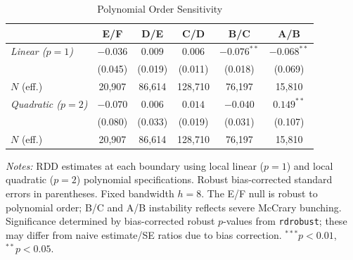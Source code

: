 \begin{table}[H]
\centering
\caption{Polynomial Order Sensitivity}
\label{tab:poly_sensitivity}
\begin{tabular}{lccccc}
\toprule
 & E/F & D/E & C/D & B/C & A/B \\
\midrule
\textit{Linear ($p=1$)} & $-0.036$ & $0.009$ & $0.006$ & $-0.076^{**}$ & $-0.068^{**}$ \\
 & (0.045) & (0.019) & (0.011) & (0.018) & (0.069) \\
\quad $N$ (eff.) & 20,907 & 86,614 & 128,710 & 76,197 & 15,810 \\
\addlinespace
\textit{Quadratic ($p=2$)} & $-0.070$ & $0.006$ & $0.014$ & $-0.040$ & $0.149^{**}$ \\
 & (0.080) & (0.033) & (0.019) & (0.031) & (0.107) \\
\quad $N$ (eff.) & 20,907 & 86,614 & 128,710 & 76,197 & 15,810 \\
\bottomrule
\end{tabular}
\begin{minipage}{\textwidth}
\footnotesize
\textit{Notes:} RDD estimates at each boundary using local linear ($p=1$) and local quadratic ($p=2$)
polynomial specifications. Robust bias-corrected standard errors in parentheses.
Fixed bandwidth $h = 8$. The E/F null is robust to polynomial order; B/C and A/B instability
reflects severe McCrary bunching. Significance determined by bias-corrected robust $p$-values from
\texttt{rdrobust}; these may differ from naive estimate/SE ratios due to bias correction.
$^{***}p<0.01$, $^{**}p<0.05$.
\end{minipage}
\end{table}
